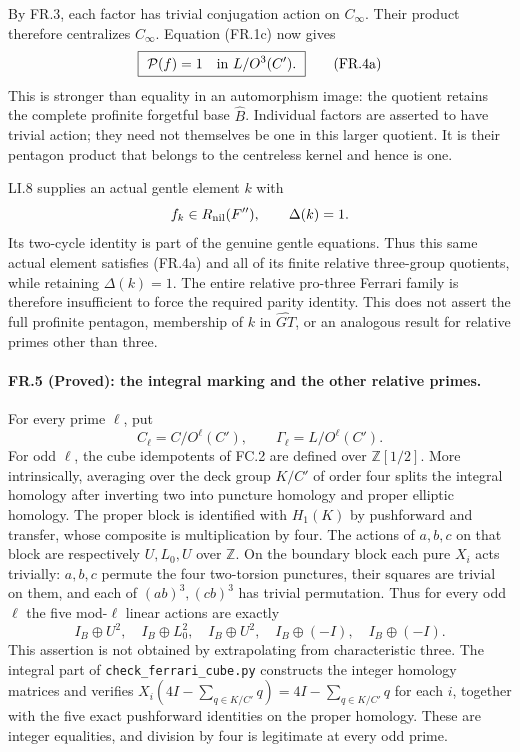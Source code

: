 By FR.3, each factor has trivial conjugation action on
$C_\infty$. Their product therefore centralizes
$C_\infty$. Equation (FR.1c) now gives
\[
             \boxed{\ \mathcal P(f)=1
                       \quad\hbox{in }L/O^3(C').\ }
 \tag{FR.4a}
\]
This is stronger than equality in an automorphism image:
the quotient retains the complete profinite forgetful
base $\widehat B$. Individual factors are asserted to
have trivial action; they need not themselves be one
in this larger quotient. It is their pentagon product
that belongs to the centreless kernel and hence is one.

LI.8 supplies an actual gentle element $k$ with
\[
            f_k\in R_{\rm nil}(F''),\qquad\Delta(k)=1.
\]
Its two-cycle identity is part of the genuine gentle
equations. Thus this same actual element satisfies
(FR.4a) and all of its finite relative three-group
quotients, while retaining $\Delta(k)=1$. The entire
relative pro-three Ferrari family is therefore
insufficient to force the required parity identity.
This does not assert the full profinite pentagon,
membership of $k$ in $\widehat{GT}$, or an analogous
result for relative primes other than three.

\paragraph{FR.5 (Proved): the integral marking and the other relative primes.}
For every prime $\ell$, put
\[
 C_\ell=C/O^\ell(C'),\qquad
 \Gamma_\ell=L/O^\ell(C').
 \tag{FR.5a}
\]
For odd $\ell$, the cube idempotents of FC.2 are defined over
$\mathbb Z[1/2]$. More intrinsically, averaging over the deck
group $K/C'$ of order four splits the integral homology after
inverting two into puncture homology and proper elliptic homology.
The proper block is identified with $H_1(K)$ by pushforward
and transfer, whose composite is multiplication by four.
The actions of $a,b,c$ on that block are respectively $U,L_0,U$
over $\mathbb Z$. On the boundary block each pure $X_i$ acts
trivially: $a,b,c$ permute the four two-torsion punctures,
their squares are trivial on them, and each of $(ab)^3,(cb)^3$
has trivial permutation. Thus for every odd $\ell$ the five
mod-$\ell$ linear actions are exactly
\[
        I_B\oplus U^2,\quad I_B\oplus L_0^2,\quad
        I_B\oplus U^2,\quad I_B\oplus(-I),\quad
        I_B\oplus(-I).
 \tag{FR.5b}
\]
This assertion is not obtained by extrapolating from characteristic
three. The integral part of \texttt{check\_ferrari\_cube.py}
constructs the integer homology matrices and verifies
$X_i(4I-\sum_{q\in K/C'}q)=4I-\sum_{q\in K/C'}q$ for
each $i$, together with the five exact pushforward identities
on the proper homology. These are integer equalities, and
division by four is legitimate at every odd prime.


